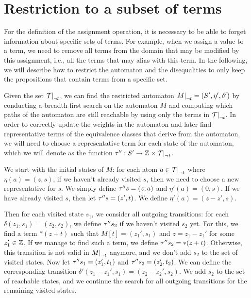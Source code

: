 \section{Restriction to a subset of terms}

For the definition of the assignment operation, it is necessary to be able to forget information about specific sets of terms.
For example, when we assign a value to a term, we need to remove all terms from the domain that may be modified by this assignment, i.e., all the terms that may alias with this term.
In the following, we will describe how to restrict the automaton and the disequalities to only keep the propositions that contain terms from a specific set.

Given the set $\restr{\T}{\neg t}$, we can find the restricted automaton $\restr{M}{\neg t} = (S', \eta', \delta')$ by conducting a breadth-first search on the automaton $M$ and computing which paths of the automaton are still reachable by using only the terms in $\restr{\T}{\neg t}$.
In order to correctly update the weights in the automaton and later find representative terms of the equivalence classes that derive from the automaton, we will need to choose a representative term for each state of the automaton, which we will denote as the function $\repr : S' \rightarrow \Z \times \restr{\T}{\neg t}$.

We start with the initial states of $M$:
for each atom $a \in \restr{\T}{\neg t}$ where $\eta(a) = (z, s)$, if we haven't already visited $s$, then we need to choose a new representative for $s$. We simply define $\tau'' s = (z, a)$ and $\eta'(a) = (0, s)$.
If we have already visited $s$, then let $\tau'' s = (z', t)$. We define $\eta'(a) = (z - z', s)$.

Then for each visited state $s_1$, we consider all outgoing transitions: for each $\delta(z_1, s_1) = (z_2, s_2)$,
we define $\tau'' s_2$ if we haven't visited $s_2$ yet.
For this, we find a term $*(z+t)$ such that $M[t] = (z_1', s_1)$ and $z = z_1 - z_1'$ for some $z_1' \in \mathbb{Z}$.
If we manage to find such a term, we define $\tau'' s_2 = *(z+t)$.
Otherwise, this transition is not valid in $\restr{M}{\neg t}$ anymore, and we don't add $s_2$ to the set of visited states.
Now let $\tau'' s_1 = (z_1', t_1)$ and $\tau'' s_2 = (z_2', t_2)$.
We can define the corresponding transition $\delta'(z_1 - z_1', s_1) = (z_2 - z_2', s_2)$.
We add $s_2$ to the set of reachable states, and we continue the search for all outgoing transitions for the remaining visited states.

